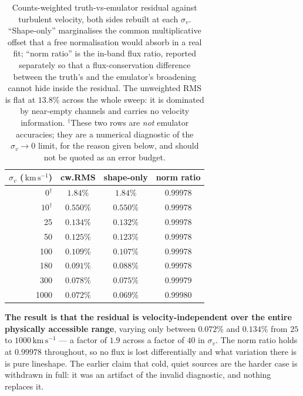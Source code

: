 \documentclass[11pt,a4paper]{article}
\newcommand{\kms}{\,\mathrm{km\,s^{-1}}}
\begin{document}
\begin{table}[ht]
\centering
\begin{tabular}{rccc}
\toprule
$\sigma_v$ ($\kms$) & cw.RMS & shape-only & norm ratio\\
\midrule
$0^\dagger$  & $1.84\%$   & $1.84\%$   & 0.99978\\
$10^\dagger$ & $0.550\%$  & $0.550\%$  & 0.99978\\
25   & $0.134\%$  & $0.132\%$  & 0.99978\\
50   & $0.125\%$  & $0.123\%$  & 0.99978\\
100  & $0.109\%$  & $0.107\%$  & 0.99978\\
180  & $0.091\%$  & $0.088\%$  & 0.99978\\
300  & $0.078\%$  & $0.075\%$  & 0.99979\\
1000 & $0.072\%$  & $0.069\%$  & 0.99980\\
\bottomrule
\end{tabular}
\caption{Counts-weighted truth-vs-emulator residual against turbulent
velocity, both sides rebuilt at each $\sigma_v$. ``Shape-only''
marginalises the common multiplicative offset that a free normalisation
would absorb in a real fit; ``norm ratio'' is the in-band flux ratio,
reported separately so that a flux-conservation difference between the
truth's and the emulator's broadening cannot hide inside the residual.
The unweighted RMS is flat at $13.8\%$ across the whole sweep: it is
dominated by near-empty channels and carries no velocity information.
$^\dagger$These two rows are \emph{not} emulator accuracies; they are a
numerical diagnostic of the $\sigma_v \to 0$ limit, for the reason given
below, and should not be quoted as an error budget.}
\label{tab:lowv}
\end{table}

\textbf{The result is that the residual is velocity-independent over the
entire physically accessible range}, varying only between $0.072\%$ and
$0.134\%$ from $25$ to $1000\kms$ --- a factor of $1.9$ across a factor
of $40$ in $\sigma_v$. The norm ratio holds at $0.99978$ throughout, so
no flux is lost differentially and what variation there is is pure
lineshape. The earlier claim that cold, quiet sources are the harder
case is withdrawn in full: it was an artifact of the invalid diagnostic,
and nothing replaces it.
\end{document}
